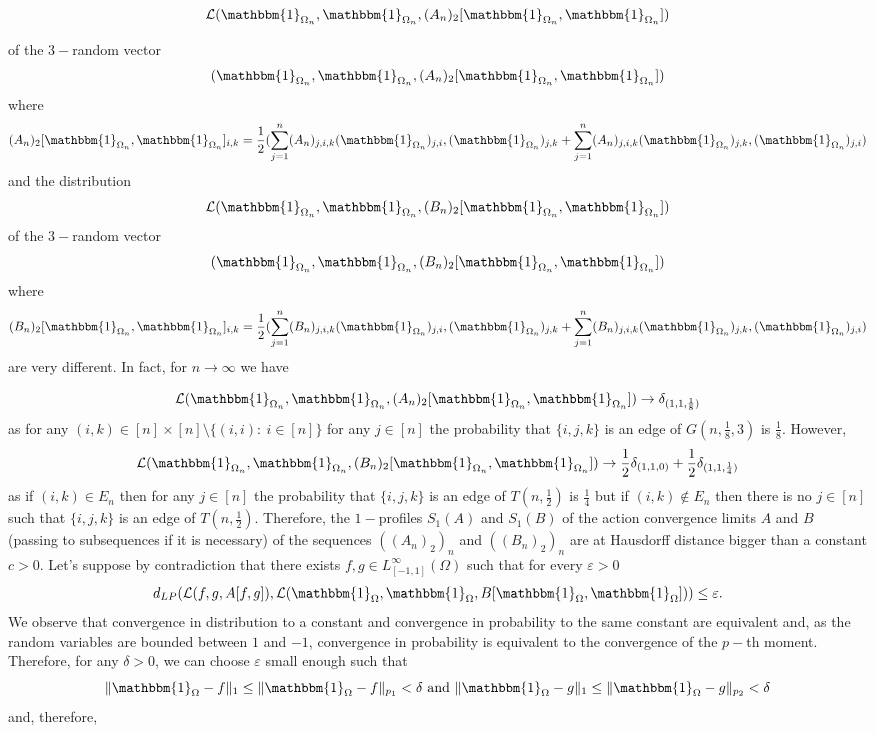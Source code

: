\documentclass[11pt]{article}
\begin{document}
$$\mathcal{L}(\mathbbm{1}_{\Omega_n},\mathbbm{1}_{\Omega_n},(A_n)_2[\mathbbm{1}_{\Omega_n},\mathbbm{1}_{\Omega_n}])$$

of the $3-$random vector 
$$(\mathbbm{1}_{\Omega_n},\mathbbm{1}_{\Omega_n},(A_n)_2[\mathbbm{1}_{\Omega_n},\mathbbm{1}_{\Omega_n}])
$$where 
$$(A_n)_2[\mathbbm{1}_{\Omega_n},\mathbbm{1}_{\Omega_n}]_{i,k}=\frac{1}{2}(\sum^n_{j=1}(A_n)_{j,i,k}(\mathbbm{1}_{\Omega_n})_{j,i},(\mathbbm{1}_{\Omega_n})_{j,k} +\sum^n_{j=1}(A_n)_{j,i,k}(\mathbbm{1}_{\Omega_n})_{j,k},(\mathbbm{1}_{\Omega_n})_{j,i} )$$
and the distribution
$$\mathcal{L}(\mathbbm{1}_{\Omega_n},\mathbbm{1}_{\Omega_n},(B_n)_2[\mathbbm{1}_{\Omega_n},\mathbbm{1}_{\Omega_n}])$$of the $3-$random vector 
$$(\mathbbm{1}_{\Omega_n},\mathbbm{1}_{\Omega_n},(B_n)_2[\mathbbm{1}_{\Omega_n},\mathbbm{1}_{\Omega_n}])
$$where 
$$(B_n)_2[\mathbbm{1}_{\Omega_n},\mathbbm{1}_{\Omega_n}]_{i,k}=\frac{1}{2}(\sum^n_{j=1}(B_n)_{j,i,k}(\mathbbm{1}_{\Omega_n})_{j,i},(\mathbbm{1}_{\Omega_n})_{j,k} +\sum^n_{j=1}(B_n)_{j,i,k}(\mathbbm{1}_{\Omega_n})_{j,k},(\mathbbm{1}_{\Omega_n})_{j,i} )$$are very different. In fact, for $n\rightarrow \infty$ we have

$$\mathcal{L}(\mathbbm{1}_{\Omega_n},\mathbbm{1}_{\Omega_n},(A_n)_2[\mathbbm{1}_{\Omega_n},\mathbbm{1}_{\Omega_n}])\rightarrow\delta_{(1,1,\frac{1}{8})}$$
as for any $(i,k)\in [n]\times [n]\setminus \{(i,i):\ i\in[n]\}$ for any $j\in [n]$ the probability that $\{i,j,k\}$ is an edge of $G(n,\frac{1}{8},3)$ is $\frac{1}{8}$.
However,
$$\mathcal{L}(\mathbbm{1}_{\Omega_n},\mathbbm{1}_{\Omega_n},(B_n)_2[\mathbbm{1}_{\Omega_n},\mathbbm{1}_{\Omega_n}])\rightarrow\frac{1}{2}\delta_{(1,1,0)}+\frac{1}{2}\delta_{(1,1,\frac{1}{4})}$$
as if $(i,k)\in E_n$ then for any $j\in [n]$ the probability that $\{i,j,k\}$ is an edge of  $T(n,\frac{1}{2})$ is $\frac{1}{4}$ but if $(i,k)\notin E_n$ then there is no $j\in [n]$ such that $\{i,j,k\}$ is an edge of  $T(n,\frac{1}{2})$.
Therefore, the $1-$profiles $S_1(A)$ and $S_1(B)$ of the action convergence limits  $A$ and $B$ (passing to subsequences if it is necessary) of the sequences $((A_n)_2)_n$ and $((B_n)_2)_n$ are at Hausdorff distance bigger than a constant $c>0$. Let's suppose by contradiction that there exists $f,g\in L_{[-1,1]}^{\infty}(\Omega)$ such that for every $\varepsilon>0$ $$d_{LP}(\mathcal{L}(f,g,A[f,g]),\mathcal{L}(\mathbbm{1}_{\Omega},\mathbbm{1}_{\Omega},B[\mathbbm{1}_{\Omega},\mathbbm{1}_{\Omega}]))\leq \varepsilon.$$
We observe that convergence in distribution to a constant and convergence in probability to the same constant are equivalent and, as the random variables are bounded between $1$ and $-1$, convergence in probability is equivalent to the convergence of the $p-$th moment. Therefore, for any $\delta >0$, we can choose $\varepsilon$ small enough such that 
$$
\|\mathbbm{1}_{\Omega}- f\|_1\leq\|\mathbbm{1}_{\Omega}- f\|_{p_1}< \delta \text{ and } \|\mathbbm{1}_{\Omega}- g\|_1\leq\|\mathbbm{1}_{\Omega}- g\|_{p_2}< \delta 
$$and, therefore, 
\end{document}
